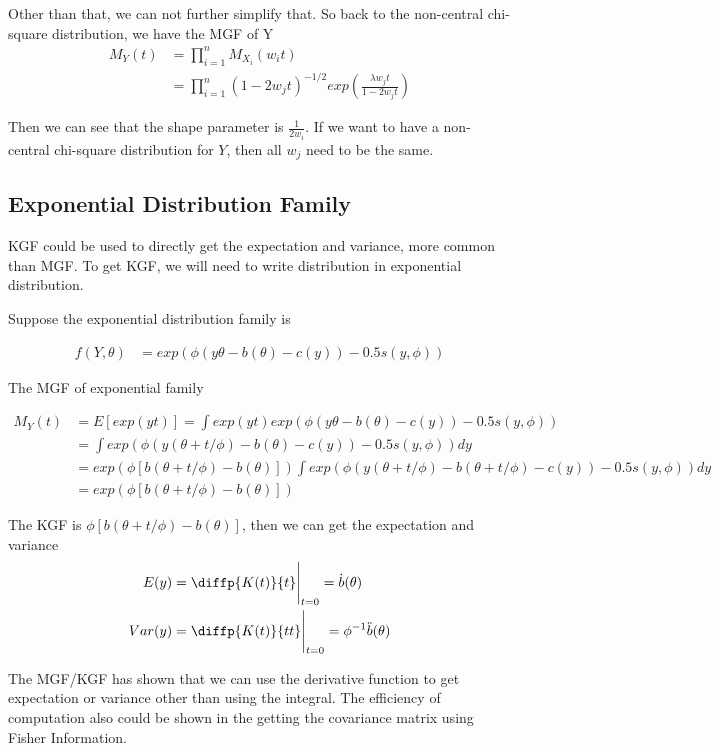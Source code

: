 \documentclass[11pt]{article} %
\begin{document}
Other than that, we can not further simplify that. So back to the non-central chi-square distribution, we have the MGF of Y
\begin{align*}
	M_Y(t) &= \prod_{i=1}^n M_{X_i}(w_i t)\\
	&=\prod_{i=1}^n  (1-2 w_jt)^{-1/2} exp \left( \frac{ \lambda w_j t }{1-2 w_j t} \right)
\end{align*}

Then we can see that the shape parameter is $\frac{1}{2 w_i}$. If we want to have a non-central chi-square distribution for $Y$, then all $w_j$ need to be the same. 


\subsection{Exponential Distribution Family}

KGF could be used to directly get the expectation and variance, more common than MGF. To get KGF, we will need to write distribution in exponential distribution.

Suppose the exponential distribution family is 

\begin{align*}
	f(Y, \theta) &= exp\left( \phi (y \theta - b(\theta) -c(y)) - 0.5s(y, \phi) \right)
\end{align*}

The MGF of exponential family

\begin{align*}
	M_Y(t) &= E[ exp(yt)] = \int exp(yt) exp\left( \phi (y \theta - b(\theta) -c(y)) - 0.5s(y, \phi) \right) \\
	&= \int  exp \left( \phi (y (\theta + t/\phi) - b(\theta) -c(y)) - 0.5s(y, \phi) \right) dy\\
	&= exp(\phi [b(\theta + t/\phi) - b(\theta)]) \int  exp\left( \phi (y (\theta + t/\phi) - b(\theta + t/\phi) -c(y)) - 0.5s(y, \phi) \right) dy\\
	&= exp(\phi [b(\theta + t/\phi) - b(\theta)]) 
\end{align*}

The KGF is $\phi [b(\theta + t/\phi) - b(\theta)]$, then we can get the expectation and variance
\begin{align*}
	E(y) &= \diffp{K(t)}{t} \Bigg |_{t=0} = \dot{b}(\theta)\\
	Var(y) &= \diffp{K(t)}{t t} \Bigg |_{t=0} = \phi^{-1} \ddot{b}(\theta)
\end{align*}

The MGF/KGF has shown that we can use the derivative function to get expectation or variance other than using the integral. The efficiency of computation also could be shown in the getting the covariance matrix using Fisher Information.
\end{document}
